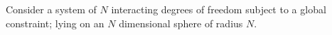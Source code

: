 Consider a system of $N$ interacting degrees of freedom subject to a global constraint; lying on an $N$ dimensional sphere of radius $N$. 